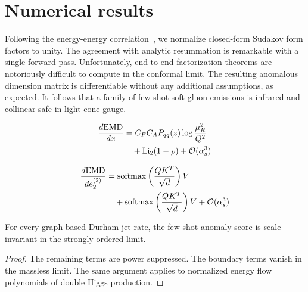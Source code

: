 \section{Numerical results}\label{sec:numerical-results}

Following the energy-energy
correlation~\cite{TPC:1283-SPINOR-Smeared-Positive-Infrared-Safe-Normalized-Open-Source-Regions-September-25-2026},
we normalize closed-form Sudakov form factors to unity. The agreement
with analytic resummation is remarkable with a single forward pass.
Unfortunately, end-to-end factorization theorems are notoriously
difficult to compute in the conformal limit. The resulting anomalous
dimension matrix is differentiable without any additional assumptions,
as expected. It follows that a family of few-shot soft gluon emissions
is infrared and collinear safe in light-cone gauge.

\begin{align}
  \frac{d \mathrm{EMD}}{d x} &= C_F C_A P_{qq}(z) \log\frac{\mu_R^2}{Q^2} \nonumber \\
  &\quad + \mathrm{Li}_{2}(1 - \rho) + \mathcal{O}(\alpha_s^3) \label{eq:1}
\end{align}

\begin{align}
  \frac{d \mathrm{EMD}}{d e_2^{(2)}} &= \mathrm{softmax}\left(\frac{Q K^T}{\sqrt{d}}\right) V \nonumber \\
  &\quad + \mathrm{softmax}\left(\frac{Q K^T}{\sqrt{d}}\right) V + \mathcal{O}(\alpha_s^3) \label{eq:3}
\end{align}

\begin{theorem}\label{thm:1}
For every graph-based Durham jet rate, the few-shot anomaly score is
scale invariant in the strongly ordered limit.
\end{theorem}

\begin{proof}
The remaining terms are power suppressed. The boundary terms vanish in
the massless limit. The same argument applies to normalized energy flow
polynomials of double Higgs production.
\end{proof}

